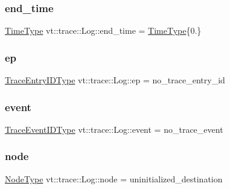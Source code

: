 \mbox{\label{structvt_1_1trace_1_1_log_a577104fb3bef671a4c0129beaecaec2d}} 
\subsubsection{\texorpdfstring{end\+\_\+time}{end\_time}}
{\footnotesize\ttfamily \hyperlink{namespacevt_a2b9f28078dc309ad0706b69ded743e69}{Time\+Type} vt\+::trace\+::\+Log\+::end\+\_\+time = \hyperlink{namespacevt_a2b9f28078dc309ad0706b69ded743e69}{Time\+Type}\{0.\}}

\mbox{\label{structvt_1_1trace_1_1_log_aaeb605b768747d37e7b4bb062f14bb32}} 
\subsubsection{\texorpdfstring{ep}{ep}}
{\footnotesize\ttfamily \hyperlink{namespacevt_1_1trace_a3c14050715ba9eceaeff51fb3de64f2f}{Trace\+Entry\+I\+D\+Type} vt\+::trace\+::\+Log\+::ep = no\+\_\+trace\+\_\+entry\+\_\+id}

\mbox{\label{structvt_1_1trace_1_1_log_a88aa88893277f0feb9776e96048a9294}} 
\subsubsection{\texorpdfstring{event}{event}}
{\footnotesize\ttfamily \hyperlink{namespacevt_1_1trace_a64a7185f3e102df8d8258f263ccd1582}{Trace\+Event\+I\+D\+Type} vt\+::trace\+::\+Log\+::event = no\+\_\+trace\+\_\+event}

\mbox{\label{structvt_1_1trace_1_1_log_a39a932cb9c4775f83117d0be477bc8c8}} 
\subsubsection{\texorpdfstring{node}{node}}
{\footnotesize\ttfamily \hyperlink{namespacevt_a866da9d0efc19c0a1ce79e9e492f47e2}{Node\+Type} vt\+::trace\+::\+Log\+::node = uninitialized\+\_\+destination}

